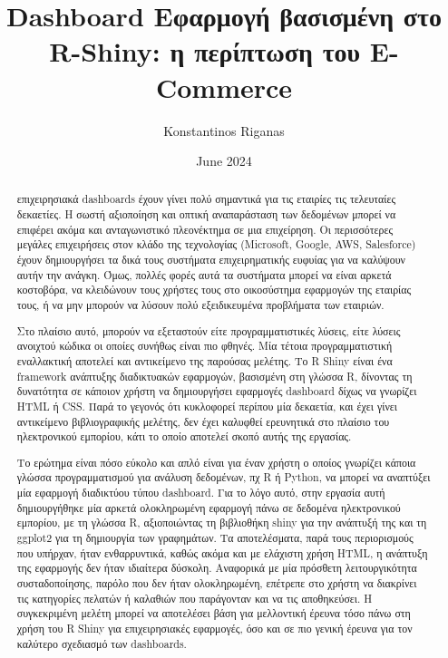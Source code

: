 \documentclass{article}
\title{Dashboard Εφαρμογή βασισμένη στο R-Shiny: η περίπτωση του E-Commerce}
\author{Konstantinos Riganas}
\date{June 2024}
\begin{document}
\maketitle

\newpage

\tableofcontents

\newpage

\begin{abstract}
     επιχειρησιακά dashboards έχουν γίνει πολύ σημαντικά για τις εταιρίες τις τελευταίες δεκαετίες. Η σωστή αξιοποίηση και οπτική αναπαράσταση των δεδομένων μπορεί να επιφέρει ακόμα και ανταγωνιστικό πλεονέκτημα σε μια επιχείρηση. Οι περισσότερες μεγάλες επιχειρήσεις στον κλάδο της τεχνολογίας (Microsoft, Google, AWS, Salesforce) έχουν δημιουργήσει τα δικά τους συστήματα επιχειρηματικής ευφυίας για να καλύψουν αυτήν την ανάγκη. Όμως, πολλές φορές αυτά τα συστήματα μπορεί να είναι αρκετά κοστοβόρα, να κλειδώνουν τους χρήστες τους στο οικοσύστημα εφαρμογών της εταιρίας τους, ή να μην μπορούν να λύσουν πολύ εξειδικευμένα προβλήματα των εταιριών.
    
    Στο πλαίσιο αυτό, μπορούν να εξεταστούν είτε προγραμματιστικές λύσεις, είτε λύσεις ανοιχτού κώδικα οι οποίες συνήθως είναι πιο φθηνές. Μία τέτοια προγραμματιστική εναλλακτική αποτελεί και αντικείμενο της παρούσας μελέτης. Το R Shiny είναι ένα framework ανάπτυξης διαδικτυακών εφαρμογών, βασισμένη στη γλώσσα R, δίνοντας τη δυνατότητα σε κάποιον χρήστη να δημιουργήσει εφαρμογές dashboard δίχως να γνωρίζει HTML ή CSS. Παρά το γεγονός ότι κυκλοφορεί περίπου μία δεκαετία, και έχει γίνει αντικείμενο βιβλιογραφικής μελέτης, δεν έχει καλυφθεί ερευνητικά στο πλαίσιο του ηλεκτρονικού εμπορίου, κάτι το οποίο αποτελεί σκοπό αυτής της εργασίας.

    Το ερώτημα είναι πόσο εύκολο και απλό είναι για έναν χρήστη ο οποίος γνωρίζει κάποια γλώσσα προγραμματισμού για ανάλυση δεδομένων, πχ R ή Python, να μπορεί να αναπτύξει μία εφαρμογή διαδικτύου τύπου dashboard. Για το λόγο αυτό, στην εργασία αυτή δημιουργήθηκε μία αρκετά ολοκληρωμένη εφαρμογή πάνω σε δεδομένα ηλεκτρονικού εμπορίου, με τη γλώσσα R, αξιοποιώντας τη βιβλιοθήκη shiny για την ανάπτυξή της και τη ggplot2 για τη δημιουργία των γραφημάτων. Τα αποτελέσματα, παρά τους περιορισμούς που υπήρχαν, ήταν ενθαρρυντικά, καθώς ακόμα και με ελάχιστη χρήση HTML, η ανάπτυξη της εφαρμογής δεν ήταν ιδιαίτερα δύσκολη. Αναφορικά με μία πρόσθετη λειτουργικότητα συσταδοποίησης, παρόλο που δεν ήταν ολοκληρωμένη, επέτρεπε στο χρήστη να διακρίνει τις κατηγορίες πελατών ή καλαθιών που παράγονταν και να τις αποθηκεύσει. Η συγκεκριμένη μελέτη μπορεί να αποτελέσει βάση για μελλοντική έρευνα τόσο  πάνω στη χρήση του R Shiny για επιχειρησιακές εφαρμογές, όσο και σε πιο γενική έρευνα για τον καλύτερο σχεδιασμό των dashboards.

\end{abstract}
\end{document}
